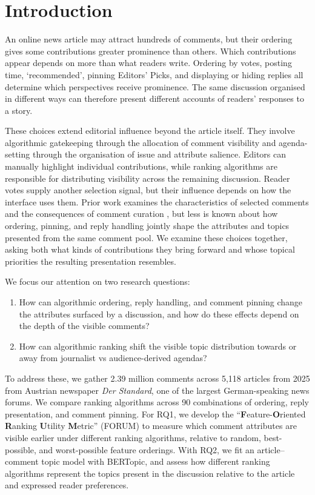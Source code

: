 \section{Introduction}
\label{sec:introduction}

An online news article may attract hundreds of comments, but their ordering gives some contributions greater prominence than others. Which contributions appear depends on more than what readers write. Ordering by votes, posting time, `recommended', pinning Editors' Picks, and displaying or hiding replies all determine which perspectives receive prominence. The same discussion organised in different ways can therefore present different accounts of readers' responses to a story.

These choices extend editorial influence beyond the article itself. They involve algorithmic gatekeeping through the allocation of comment visibility and agenda-setting through the organisation of issue and attribute salience. Editors can manually highlight individual contributions, while ranking algorithms are responsible for distributing visibility across the remaining discussion. Reader votes supply another selection signal, but their influence depends on how the interface uses them. Prior work examines the characteristics of selected comments and the consequences of comment curation \citep{Diakopoulos2015,JuarezMiro2022,He2024,Wang2021}, but less is known about how ordering, pinning, and reply handling jointly shape the attributes and topics presented from the same comment pool. We examine these choices together, asking both what kinds of contributions they bring forward and whose topical priorities the resulting presentation resembles.

We focus our attention on two research questions:
\begin{enumerate}[label=RQ\arabic*]
\item How can algorithmic ordering, reply handling, and comment pinning change the attributes surfaced by a discussion, and how do these effects depend on the depth of the visible comments?
\item How can algorithmic ranking shift the visible topic distribution towards or away from journalist vs audience-derived agendas?
\end{enumerate}

To address these, we gather 2.39 million comments across 5,118 articles from 2025 from Austrian newspaper \textit{Der Standard}, one of the largest German-speaking news forums. We compare ranking algorithms across 90 combinations of ordering, reply presentation, and comment pinning. For RQ1, we develop the ``\textbf{F}eature-\textbf{O}riented \textbf{R}anking \textbf{U}tility \textbf{M}etric'' (FORUM) to measure which comment attributes are visible earlier under different ranking algorithms, relative to random, best-possible, and worst-possible feature orderings. With RQ2, we fit an article--comment topic model with BERTopic, and assess how different ranking algorithms represent the topics present in the discussion relative to the article and expressed reader preferences.

